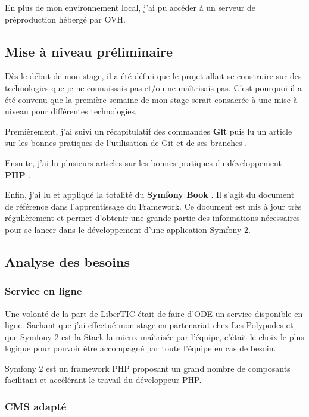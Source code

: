 En plus de mon environnement local, j'ai pu accéder à un serveur de préproduction hébergé par OVH.

\subsection{Mise à niveau préliminaire}

Dès le début de mon stage, il a été défini que le projet allait se construire sur des technologies que je ne connaissais pas et/ou ne maîtrisais pas. C'est pourquoi il a été convenu que la première semaine de mon stage serait consacrée à une mise à niveau pour différentes technologies.

Premièrement, j'ai suivi un récapitulatif des commandes \textbf{Git}  puis lu un article sur les bonnes pratiques de l'utilisation de Git et de ses branches .

Ensuite, j'ai lu plusieurs articles sur les bonnes pratiques du développement \textbf{PHP}  .

Enfin, j'ai lu et appliqué la totalité du \textbf{Symfony Book} . Il s'agit du document de référence dans l'apprentissage du Framework. Ce document est mis à jour très régulièrement et permet d'obtenir une grande partie des informations nécessaires pour se lancer dans le développement d'une application Symfony 2.

\subsection{Analyse des besoins}

\subsubsection*{Service en ligne}

Une volonté de la part de LiberTIC était de faire d'ODE un service disponible en ligne. 
Sachant que j'ai effectué mon stage en partenariat chez Les Polypodes et que Symfony 2 est la Stack la mieux maîtrisée par l'équipe, c'était le choix le plus logique pour pouvoir être accompagné par toute l'équipe en cas de besoin.

Symfony 2 est un framework PHP proposant un grand nombre de composants facilitant et accélérant le travail du développeur PHP.

\subsubsection*{CMS adapté}

